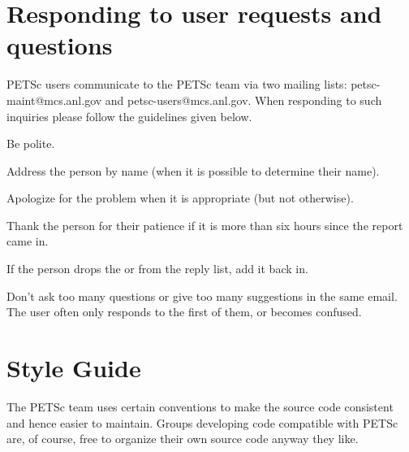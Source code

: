 \pagestyle{fancy}
\chapter{Responding to user requests and questions}

PETSc users communicate to the PETSc team via two mailing lists:
petsc-maint@mcs.anl.gov and petsc-users@mcs.anl.gov. When responding
to such inquiries please follow the guidelines given below.

\begin{tightitemize}
\item Be polite.
\item Address the person by name (when it is possible to determine their name).
\item Apologize for the problem when it is appropriate (but not otherwise).
\item Thank the person for their patience if it is more than six hours since the report came in.
\item If the person drops the  or  from the reply list, add it back in.
\item Don't ask too many questions or give too many suggestions in the same email. The user often only responds to the first of them, or becomes confused.
\end{tightitemize}

\chapter{Style Guide}\label{chapter:styleguide}

The PETSc team uses certain conventions to make the source code consistent and hence easier to maintain. Groups
developing code compatible with PETSc are, of course, free to organize their
own source code anyway they like.

